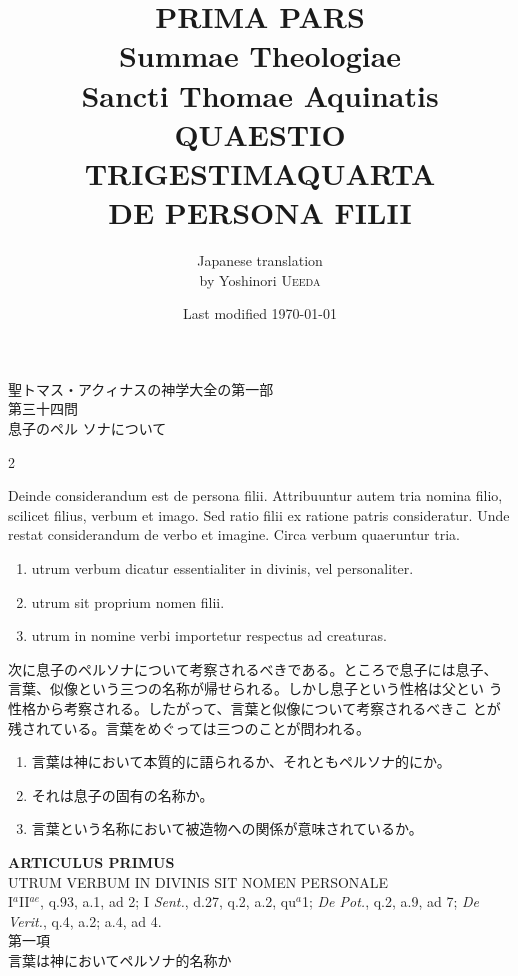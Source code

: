 \documentclass[paper=a4paper,fontsize=10pt,jafontsize=9pt,titlepage]{jlreq}
\title{{\bfseries PRIMA PARS}\\{\Huge Summae Theologiae}\\Sancti Thomae
Aquinatis\\{\sffamily QUAESTIO TRIGESTIMAQUARTA}\\DE PERSONA FILII}
\author{Japanese translation\\by Yoshinori {\scshape Ueeda}}
\date{Last modified \today}
\begin{document}
\maketitle

\thispagestyle{empty}
\begin{center}
{\Large 聖トマス・アクィナスの神学大全の第一部\\第三十四問\\息子のペル
 ソナについて}
\end{center}



\begin{paracol}{2}

{\Huge D}einde considerandum est de persona filii. Attribuuntur autem tria
 nomina filio, scilicet filius, verbum et imago. Sed ratio filii ex
 ratione patris consideratur. Unde restat considerandum de verbo et
 imagine. Circa verbum quaeruntur tria. 


\begin{enumerate}
 \item utrum verbum dicatur essentialiter in divinis, vel
       personaliter.
 \item utrum sit proprium nomen filii. 
 \item utrum in nomine verbi importetur respectus ad creaturas.
\end{enumerate}

\switchcolumn

次に息子のペルソナについて考察されるべきである。ところで息子には息子、
 言葉、似像という三つの名称が帰せられる。しかし息子という性格は父とい
 う性格から考察される。したがって、言葉と似像について考察されるべきこ
 とが残されている。言葉をめぐっては三つのことが問われる。

\begin{enumerate}
 \item 言葉は神において本質的に語られるか、それともペルソナ的にか。
 \item それは息子の固有の名称か。
 \item 言葉という名称において被造物への関係が意味されているか。
\end{enumerate}

\end{paracol}

\newpage

\begin{center}
{\Large {\bfseries ARTICULUS PRIMUS}}\\
{\large UTRUM VERBUM IN DIVINIS SIT NOMEN PERSONALE}\\
{\footnotesize I$^{a}$II$^{ae}$, q.93, a.1, ad 2; I {\itshape Sent.},
 d.27, q.2, a.2, qu$^{a}$1; {\itshape De Pot.}, q.2, a.9, ad 7;
 {\itshape De Verit.}, q.4, a.2; a.4, ad 4.}\\
{\Large 第一項\\言葉は神においてペルソナ的名称か}
\end{center}
\end{document}
